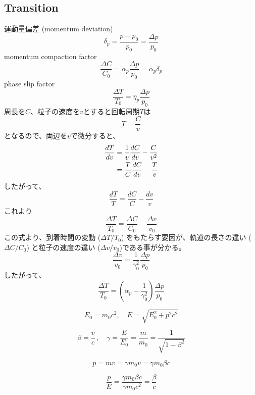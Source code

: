 \documentclass[10pt,a4paper]{ltjsarticle}
\begin{document}
\subsection{Transition}
運動量偏差 (momentum deviation)
\begin{equation}
    \delta_p = \frac{p-p_0}{p_0}=\frac{\Delta p}{p_0}
\end{equation}
%
momentum compaction factor
%
\begin{equation}
    \frac{\Delta C}{C_0}=\alpha_p\frac{\Delta p}{p_0}=\alpha_p\delta_p
\end{equation}
%
phase slip factor
\begin{equation}
    \frac{\Delta T}{T_0}=\eta_p\frac{\Delta p}{p_0}
\end{equation}
%
周長を$C$、粒子の速度を$v$とすると回転周期$T$は
%
\begin{equation}
    T=\frac{C}{v}
\end{equation}
%
となるので、両辺を$v$で微分すると、
%
\begin{align}
    \frac{dT}{dv} &= \frac{1}{v}\frac{dC}{dv}-\frac{C}{v^2} \notag \\
    & = \frac{T}{C}\frac{dC}{dv} - \frac{T}{v}
\end{align}
%
したがって、
%
\begin{equation}
    \frac{dT}{T} = \frac{dC}{C} - \frac{dv}{v}
\end{equation}
%
これより
%
\begin{equation}
    \frac{\Delta T}{T_0} = \frac{\Delta C}{C_0} - \frac{\Delta v}{v_0}
\end{equation}
%
この式より、到着時間の変動 ($\Delta T/T_0$) をもたらす要因が、軌道の長さの違い ($\Delta C/C_0$) と粒子の速度の違い ($\Delta v/v_0$)である事が分かる。
%
\begin{equation}
    \frac{\Delta v}{v_0}=\frac{1}{\gamma_0^2}\frac{\Delta p}{p_0}
    \label{delta_v}
\end{equation}
%
したがって、
%
\begin{equation}
    \frac{\Delta T}{T_0} = \left(\alpha_p - \frac{1}{\gamma_0^2}\right)\frac{\Delta p}{p_0}
\end{equation}
%
\begin{tcolorbox}[title=相対論のおさらい]
    \begin{equation}
        E_0 = m_0 c^2 ,\quad E = \sqrt{E_0^2 + p^2 c^2} \tag{A.1}
    \end{equation}

    \begin{equation}
        \beta = \frac{v}{c}\,,\quad \gamma = \frac{E}{E_0}=\frac{m}{m_0}=\frac{1}{\sqrt{1-\beta^2}} \tag{A.2}
    \end{equation}

    \begin{equation}
        p = mv = \gamma m_0 v = \gamma m_0 \beta c \tag{A.3}
    \end{equation}

    \begin{equation}
        \frac{p}{E} = \frac{\gamma m_0 \beta c}{\gamma m_0 c^2} = \frac{\beta}{c} \tag{A.4}
    \end{equation}
\end{tcolorbox}
\end{document}

